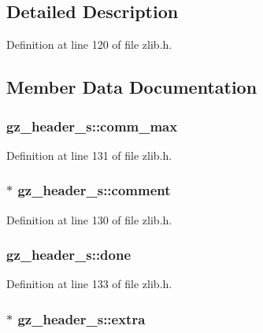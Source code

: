 \subsection{Detailed Description}


Definition at line 120 of file zlib.\-h.



\subsection{Member Data Documentation}
\hypertarget{structgz__header__s_aa0529f45e5c08b3009cfc2a61a86aea0}{
\subsubsection[{comm\-\_\-max}]{ gz\-\_\-header\-\_\-s\-::comm\-\_\-max}}\label{structgz__header__s_aa0529f45e5c08b3009cfc2a61a86aea0}


Definition at line 131 of file zlib.\-h.

\hypertarget{structgz__header__s_a1d4fd0807e838ce4bfde54aa021e18e9}{
\subsubsection[{comment}]{$\ast$ gz\-\_\-header\-\_\-s\-::comment}}\label{structgz__header__s_a1d4fd0807e838ce4bfde54aa021e18e9}


Definition at line 130 of file zlib.\-h.

\hypertarget{structgz__header__s_ab8fd11f59b76a7d031e24bede8679d9d}{
\subsubsection[{done}]{ gz\-\_\-header\-\_\-s\-::done}}\label{structgz__header__s_ab8fd11f59b76a7d031e24bede8679d9d}


Definition at line 133 of file zlib.\-h.

\hypertarget{structgz__header__s_a397959afc459da7e296c676a3d4c1915}{
\subsubsection[{extra}]{$\ast$ gz\-\_\-header\-\_\-s\-::extra}}\label{structgz__header__s_a397959afc459da7e296c676a3d4c1915}


